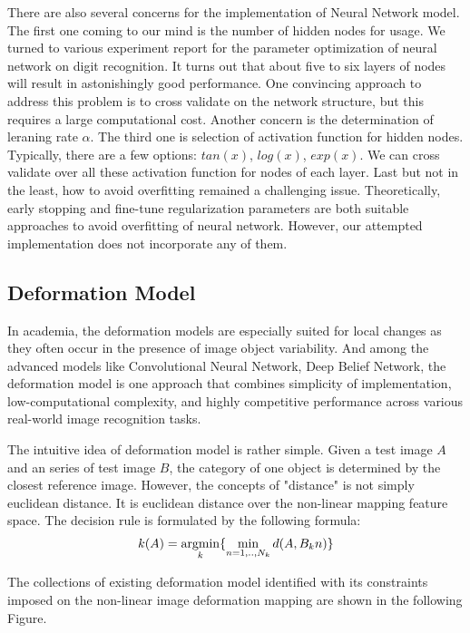 \documentclass{article} %
\newcommand{\argmin}{\operatornamewithlimits{argmin}}
\begin{document}
There are also several concerns for the implementation of Neural Network model.
The first one coming to our mind is the number of hidden nodes for usage. We
turned to various experiment report for the parameter optimization of neural
network on digit recognition. It turns out that about five to six layers of
nodes will result in astonishingly good performance. One convincing approach
to address this problem is to cross validate on the network structure, but
this requires a large computational cost.
Another concern is the determination of leraning rate $\alpha$. The third one
is selection of activation function for hidden nodes. Typically, there are a
few options: $tan(x)$, $log(x)$, $exp(x)$. We can cross validate over all
these activation function for nodes of each layer. Last but not in the least,
 how to avoid overfitting remained a challenging issue. Theoretically, early
 stopping and fine-tune regularization parameters are both suitable approaches
 to avoid overfitting of neural network. However, our attempted implementation
 does not incorporate any of them. 

\subsection{Deformation Model}

In academia, the deformation models are especially suited for local changes as they often
occur in the presence of image object variability. And among the
advanced models like Convolutional Neural Network, Deep Belief Network, the
deformation model is one approach that combines simplicity of implementation,
low-computational complexity, and highly competitive performance across
various real-world image recognition tasks.


The intuitive idea of deformation model is rather simple.
Given a test image $A$ and an series of test image $B$, the category of
one object is determined by the closest reference image. However, the concepts
of "distance" is not simply euclidean distance. It is euclidean distance over
the non-linear mapping feature space. The decision rule is formulated by the
following formula:
\begin{align}
    k(A) = \argmin_{k} \{ \min_{n=1,..,N_k} d(A, B_kn) \}
\end{align}


The collections of existing deformation model identified with its constraints
imposed on the non-linear image deformation mapping are shown in the 
following Figure.
\end{document}
